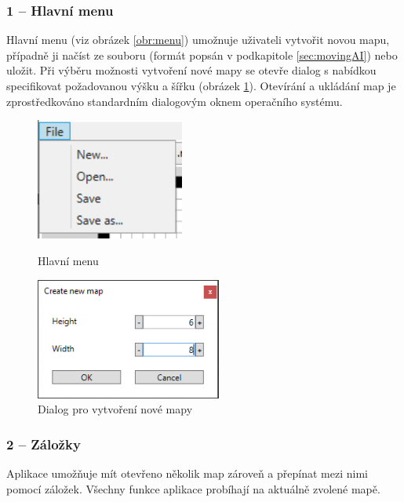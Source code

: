 \subsubsection{1 -- Hlavní menu}
Hlavní menu (viz obrázek \ref{obr:menu}) umožnuje uživateli vytvořit novou mapu, případně ji načíst ze souboru (formát popsán v podkapitole \ref{sec:movingAI}) nebo uložit. Při výběru možnosti vytvoření nové mapy se otevře dialog s nabídkou specifikovat požadovanou výšku a šířku (obrázek \ref{obr:newMapDialog}). Otevírání a ukládání map je zprostředkováno standardním dialogovým oknem operačního systému.

\begin{figure}[htb]
	\centering
	\begin{minipage}{.5\textwidth}
		\centering
		\includegraphics[height=4cm,keepaspectratio]{obr/menu}
		\vspace*{4mm}
		\caption{Hlavní menu}
		\label{obr:menu}
	\end{minipage}%
	\begin{minipage}{.5\textwidth}
		\centering
		\includegraphics[height=4cm]{obr/newMapDialog}
		\vspace*{4mm}
		\caption{Dialog pro vytvoření nové mapy}
		\label{obr:newMapDialog}
	\end{minipage}
\end{figure}

\subsubsection{2 -- Záložky}
Aplikace umožňuje mít otevřeno několik map zároveň a přepínat mezi nimi pomocí záložek. Všechny funkce aplikace probíhají na aktuálně zvolené mapě.

